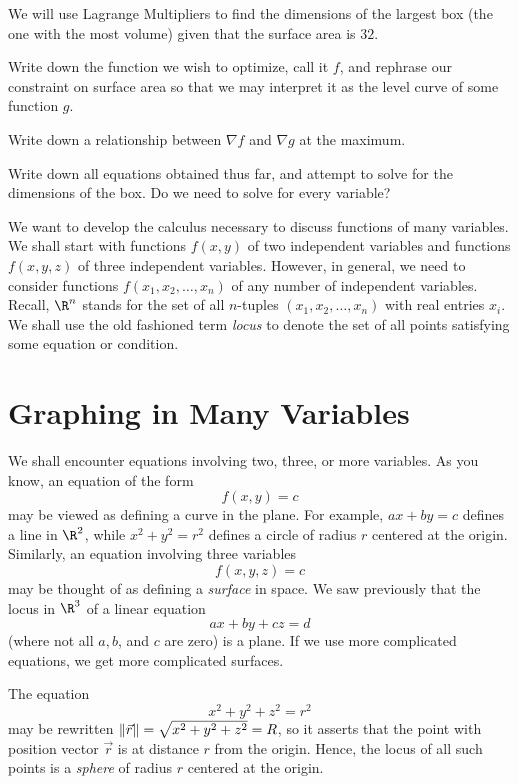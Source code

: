 \begin{question}
	We will use Lagrange Multipliers to find the dimensions of the largest box (the one with the most volume)
	given that the surface area is $32$.
	\begin{parts}
		\item Write down the function we wish to optimize, call it $f$, and rephrase our constraint
			on surface area so that we may interpret it as the level curve of some function $g$.
		\item Write down a relationship between $\nabla f$ and $\nabla g$ at the maximum.
		\item Write down all equations obtained thus far, and attempt to solve for the dimensions of the box.
			Do we need to solve for every variable?
	\end{parts}
\end{question}




\newpage
We want to develop the calculus necessary to discuss functions
of many variables.   We shall start with functions
$f(x,y)$ of two independent
variables and functions $f(x,y,z)$ of three independent
variables.   However, in general, we need to consider functions
$f(x_1, x_2, \dots, x_n)$ of any number 
of independent variables.   Recall, $\R^n$ stands
for the set of all $n$-tuples $(x_1,x_2,\dots,x_n)$
with real entries $x_i$.  We shall use the old fashioned term \emph{locus}
to denote the set of all points satisfying some equation or condition.

\section{Graphing in Many Variables}

We shall encounter equations involving two, three, or more variables.
As you know, an equation of the form
\[
     f(x,y) = c
\]
may be viewed as defining a curve in the plane.  For example,
$ax + by = c$ defines a line in $\R^2$, while $x^2 + y^2 = r^2$
defines a circle of radius $r$ centered at the origin.
Similarly, an equation involving three variables
\[
   f(x,y,z) = c
\]
may be thought of as defining a \emph{surface} in space.
We saw previously that the locus in $\R^3$ of a linear equation
\[
   ax + by + cz = d
\]
(where not all $a, b$, and $c$ are zero) is a plane.   If we
use more complicated equations, we get more complicated surfaces.

\begin{example}
	The equation
	\[
	   x^2 + y^2 + z^2 = r^2
	\]
	may be rewritten $\lVert\vec r\rVert = \sqrt{x^2 + y^2 + z^2} = R$, so it
	asserts that the point with position vector $\vec r$ is at distance
	$r$ from the origin.  Hence, the locus of all such points is a
	\emph{sphere} of radius $r$ centered at the origin.
\end{example}

